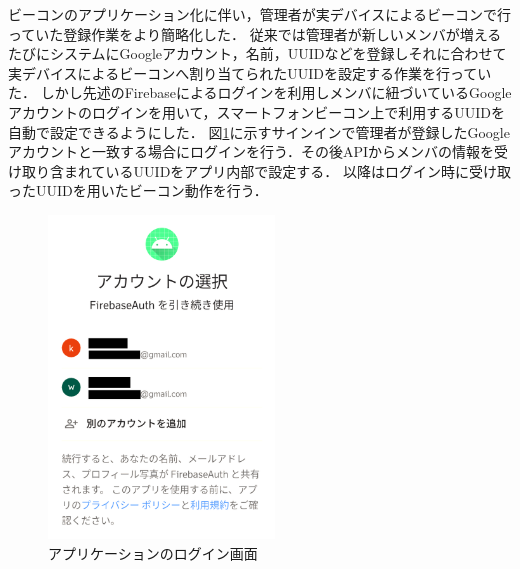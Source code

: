 ビーコンのアプリケーション化に伴い，管理者が実デバイスによるビーコンで行っていた登録作業をより簡略化した．
従来では管理者が新しいメンバが増えるたびにシステムにGoogleアカウント，名前，UUIDなどを登録しそれに合わせて実デバイスによるビーコンへ割り当てられたUUIDを設定する作業を行っていた．
しかし先述のFirebaseによるログインを利用しメンバに紐づいているGoogleアカウントのログインを用いて，スマートフォンビーコン上で利用するUUIDを自動で設定できるようにした．
図\ref{fig:AppSignIn}に示すサインインで管理者が登録したGoogleアカウントと一致する場合にログインを行う．その後APIからメンバの情報を受け取り含まれているUUIDをアプリ内部で設定する．
以降はログイン時に受け取ったUUIDを用いたビーコン動作を行う．
\begin{figure}[tbh]
  \centering
  \includegraphics[width=6cm]{image/AppSignIn.png}
  \caption{アプリケーションのログイン画面}
  \label{fig:AppSignIn}
\end{figure}

